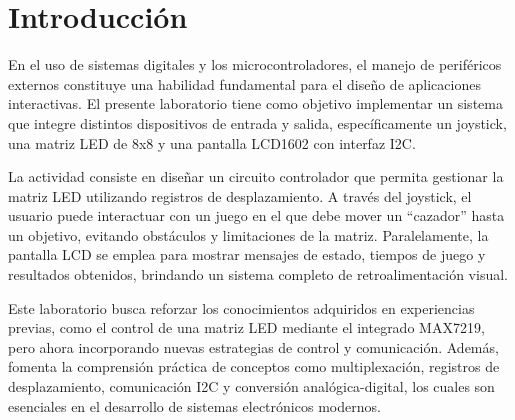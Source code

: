 \section{Introducción}
En el uso de sistemas digitales y los microcontroladores, el manejo de periféricos externos constituye
una habilidad fundamental para el diseño de aplicaciones interactivas. El presente laboratorio tiene como
objetivo implementar un sistema que integre distintos dispositivos de entrada y salida, específicamente un
joystick, una matriz LED de 8x8 y una pantalla LCD1602 con interfaz I2C.


La actividad consiste en diseñar un circuito controlador que permita gestionar la matriz LED utilizando
registros de desplazamiento. A través del joystick, el usuario puede interactuar con un juego en el que debe mover un “cazador” hasta un
objetivo, evitando obstáculos y limitaciones de la matriz. Paralelamente, la pantalla LCD se emplea para
mostrar mensajes de estado, tiempos de juego y resultados obtenidos, brindando un sistema completo de retroalimentación visual.


Este laboratorio busca reforzar los conocimientos adquiridos en experiencias previas, como el control de una
matriz LED mediante el integrado MAX7219, pero ahora incorporando nuevas estrategias de control y
comunicación. Además, fomenta la comprensión práctica de conceptos como multiplexación, registros de
desplazamiento, comunicación I2C y conversión analógica-digital, los cuales son esenciales en el desarrollo
de sistemas electrónicos modernos.